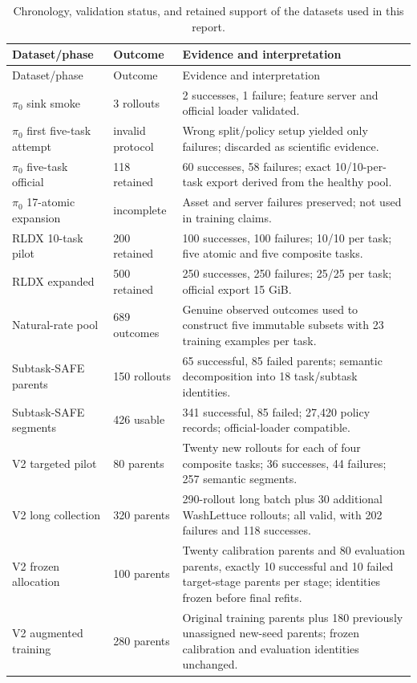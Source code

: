 \documentclass[11pt,a4paper]{article}
\begin{document}
\begin{longtable}{p{}p{}p{}}
\caption{Chronology, validation status, and retained support of the datasets used in this report.}
\label{tab:dataset-chronology}\\
\toprule
Dataset/phase & Outcome & Evidence and interpretation\\
\midrule
\endfirsthead
\toprule
Dataset/phase & Outcome & Evidence and interpretation\\
\midrule
\endhead
$\pi_0$ sink smoke & 3 rollouts & 2 successes, 1 failure; feature server and official loader validated.\\
$\pi_0$ first five-task attempt & invalid protocol & Wrong split/policy setup yielded only failures; discarded as scientific evidence.\\
$\pi_0$ five-task official & 118 retained & 60 successes, 58 failures; exact 10/10-per-task export derived from the healthy pool.\\
$\pi_0$ 17-atomic expansion & incomplete & Asset and server failures preserved; not used in training claims.\\
RLDX 10-task pilot & 200 retained & 100 successes, 100 failures; 10/10 per task; five atomic and five composite tasks.\\
RLDX expanded & 500 retained & 250 successes, 250 failures; 25/25 per task; official export 15 GiB.\\
Natural-rate pool & 689 outcomes & Genuine observed outcomes used to construct five immutable subsets with 23 training examples per task.\\
Subtask-SAFE parents & 150 rollouts & 65 successful, 85 failed parents; semantic decomposition into 18 task/subtask identities.\\
Subtask-SAFE segments & 426 usable & 341 successful, 85 failed; 27,420 policy records; official-loader compatible.\\
V2 targeted pilot & 80 parents & Twenty new rollouts for each of four composite tasks; 36 successes, 44 failures; 257 semantic segments.\\
V2 long collection & 320 parents & 290-rollout long batch plus 30 additional WashLettuce rollouts; all valid, with 202 failures and 118 successes.\\
V2 frozen allocation & 100 parents & Twenty calibration parents and 80 evaluation parents, exactly 10 successful and 10 failed target-stage parents per stage; identities frozen before final refits.\\
V2 augmented training & 280 parents & Original training parents plus 180 previously unassigned new-seed parents; frozen calibration and evaluation identities unchanged.\\

\end{longtable}
\end{document}
